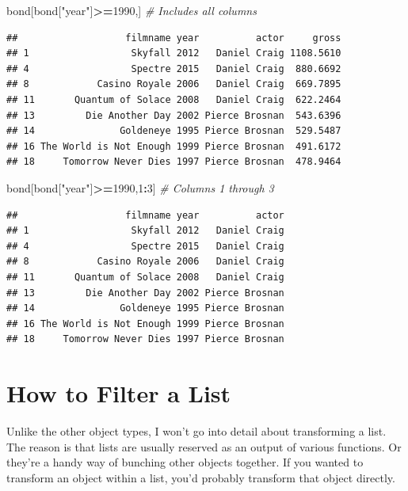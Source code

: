 \documentclass[
]{book}
\newenvironment{Shaded}{\begin{snugshade}}{\end{snugshade}}
\newcommand{\CommentTok}[1]{\textcolor[rgb]{0.56,0.35,0.01}{\textit{#1}}}
\newcommand{\DecValTok}[1]{\textcolor[rgb]{0.00,0.00,0.81}{#1}}
\newcommand{\NormalTok}[1]{#1}
\newcommand{\OperatorTok}[1]{\textcolor[rgb]{0.81,0.36,0.00}{\textbf{#1}}}
\newcommand{\StringTok}[1]{\textcolor[rgb]{0.31,0.60,0.02}{#1}}
\begin{document}
\begin{center}
\begin{Shaded}
\begin{Highlighting}[]
\NormalTok{bond[bond[}\StringTok{"year"}\NormalTok{]}\OperatorTok{>=}\DecValTok{1990}\NormalTok{,] }\CommentTok{# Includes all columns}
\end{Highlighting}
\end{Shaded}

\begin{verbatim}
##                   filmname year          actor     gross
## 1                  Skyfall 2012   Daniel Craig 1108.5610
## 4                  Spectre 2015   Daniel Craig  880.6692
## 8            Casino Royale 2006   Daniel Craig  669.7895
## 11       Quantum of Solace 2008   Daniel Craig  622.2464
## 13         Die Another Day 2002 Pierce Brosnan  543.6396
## 14               Goldeneye 1995 Pierce Brosnan  529.5487
## 16 The World is Not Enough 1999 Pierce Brosnan  491.6172
## 18     Tomorrow Never Dies 1997 Pierce Brosnan  478.9464
\end{verbatim}

\begin{Shaded}
\begin{Highlighting}[]
\NormalTok{bond[bond[}\StringTok{"year"}\NormalTok{]}\OperatorTok{>=}\DecValTok{1990}\NormalTok{,}\DecValTok{1}\OperatorTok{:}\DecValTok{3}\NormalTok{] }\CommentTok{# Columns 1 through 3}
\end{Highlighting}
\end{Shaded}

\begin{verbatim}
##                   filmname year          actor
## 1                  Skyfall 2012   Daniel Craig
## 4                  Spectre 2015   Daniel Craig
## 8            Casino Royale 2006   Daniel Craig
## 11       Quantum of Solace 2008   Daniel Craig
## 13         Die Another Day 2002 Pierce Brosnan
## 14               Goldeneye 1995 Pierce Brosnan
## 16 The World is Not Enough 1999 Pierce Brosnan
## 18     Tomorrow Never Dies 1997 Pierce Brosnan
\end{verbatim}

\hypertarget{how-to-filter-a-list}{%
\section{How to Filter a List}\label{how-to-filter-a-list}}

Unlike the other object types, I won't go into detail about transforming a list. The reason is that lists are usually reserved as an output of various functions. Or they're a handy way of bunching other objects together. If you wanted to transform an object within a list, you'd probably transform that object directly.


\end{center}
\end{document}
